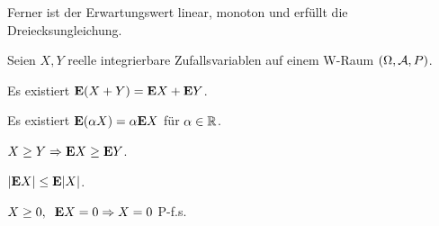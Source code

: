Ferner ist der Erwartungswert linear, monoton und erfüllt die
Dreiecksungleichung.

\begin{prop}
\label{prop:4.2}
Seien $X, Y $ reelle integrierbare Zufallsvariablen auf einem W-Raum
$(\Omega, \AA, P)$.
\begin{propenum}
\item
Es existiert $\E(X+Y)= \E X +\E Y$.
\item
Es existiert $\E(\alpha X)= \alpha \E X$ für $\alpha \in \R$.
\item
$X \geq Y \Rightarrow \E X \geq \E Y $.
\item
$|\E X|\leq \E|X| $.
\item
$X \geq 0, \; \; \E X =0 \Rightarrow X = 0 $ P-f.s.\fishhere
\end{propenum}
\end{prop}

